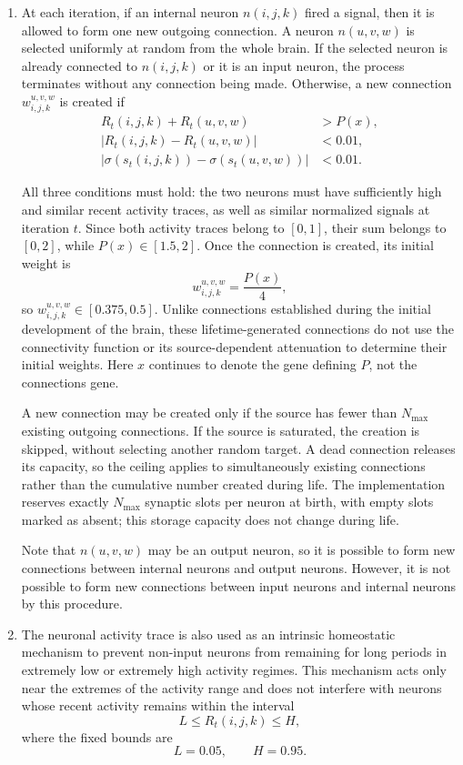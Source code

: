 \documentclass[12pt,a4paper]{article}
\begin{document}
\begin{enumerate}
	\item At each iteration, if an internal neuron $n(i,j,k)$ fired a signal, then it is allowed to form one new outgoing connection. A neuron $n(u,v,w)$ is selected uniformly at random from the whole brain. If the selected neuron is already connected to $n(i,j,k)$ or it is an input neuron, the process terminates without any connection being made. Otherwise, a new connection $w_{i,j,k}^{u,v,w}$ is created if
	\[
	\begin{aligned}
	R_t(i,j,k)+R_t(u,v,w) &> P(x),\\
	\bigl|R_t(i,j,k)-R_t(u,v,w)\bigr| &< 0.01,\\
	\bigl|\sigma(s_t(i,j,k))-\sigma(s_t(u,v,w))\bigr| &< 0.01.
	\end{aligned}
	\]

	All three conditions must hold: the two neurons must have sufficiently high and similar recent activity traces, as well as similar normalized signals at iteration $t$. Since both activity traces belong to $[0,1]$, their sum belongs to $[0,2]$, while $P(x)\in[1.5,2]$. Once the connection is created, its initial weight is
	$$w_{i,j,k}^{u,v,w} = \frac{P(x)}{4},$$
so $w_{i,j,k}^{u,v,w}\in[0.375,0.5]$. Unlike connections established during the initial development of the brain, these lifetime-generated connections do not use the connectivity function or its source-dependent attenuation to determine their initial weights. Here $x$ continues to denote the gene defining $P$, not the connections gene.

	A new connection may be created only if the source has fewer than $N_{\max}$ existing outgoing connections. If the source is saturated, the creation is skipped, without selecting another random target. A dead connection releases its capacity, so the ceiling applies to simultaneously existing connections rather than the cumulative number created during life. The implementation reserves exactly $N_{\max}$ synaptic slots per neuron at birth, with empty slots marked as absent; this storage capacity does not change during life.

	Note that $n(u, v, w)$ may be an output neuron, so it is possible to form new connections between internal neurons and output neurons. However, it is not possible to form new connections between input neurons and internal neurons by this procedure.
	
	\item The neuronal activity trace is also used as an intrinsic homeostatic mechanism to prevent non-input neurons from remaining for long periods in extremely low or extremely high activity regimes. This mechanism acts only near the extremes of the activity range and does not interfere with neurons whose recent activity remains within the interval
	$$L \leq R_t(i,j,k) \leq H,$$
where the fixed bounds are
	$$L=0.05, \qquad H=0.95.$$


\end{enumerate}
\end{document}
